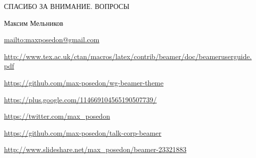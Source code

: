 \documentclass[aspectratio=169]{beamer}
\begin{document}
% 
{



\begin{frame}{СПАСИБО ЗА ВНИМАНИЕ. ВОПРОСЫ}
    \begin{block}{Максим Мельников}
    \par \url{mailto:maxposedon@gmail.com}
    \par \url{http://www.tex.ac.uk/ctan/macros/latex/contrib/beamer/doc/beameruserguide.pdf}
    \par \url{https://github.com/max-posedon/wg-beamer-theme}
    \par \url{https://plus.google.com/114669104565190507739/}
    \par \url{https://twitter.com/max\_posedon}
    \par \url{https://github.com/max-posedon/talk-corp-beamer}
    \par \url{http://www.slideshare.net/max\_posedon/beamer-23321883}
    \end{block}
\end{frame}
}
\end{document}
